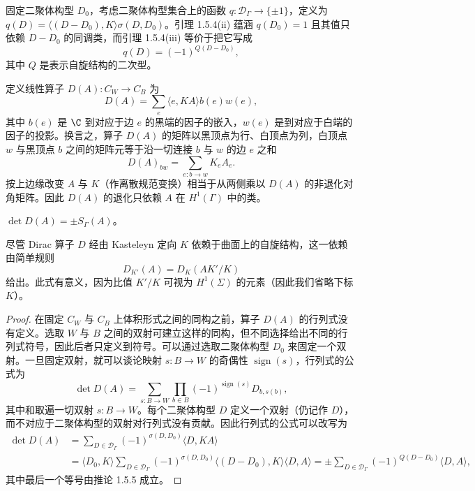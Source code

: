 \begin{corollary}\label{cor:1.5.5}
固定二聚体构型 $D_0$，考虑二聚体构型集合上的函数 $q:\mathcal{D}_\Gamma\to\{\pm1\}$，定义为 $q(D)=\langle(D-D_0),K\rangle\sigma(D,D_0)$。引理 1.5.4(ii) 蕴涵 $q(D_0)=1$ 且其值只依赖 $D-D_0$ 的同调类，而引理 1.5.4(iii) 等价于把它写成
\[
q(D)=(-1)^{Q(D-D_0)},
\]
其中 $Q$ 是表示自旋结构的二次型。
\end{corollary}

定义线性算子 $D(A): C_W\to C_B$ 为
\[
D(A)=\sum_e\langle e,KA\rangle b(e)w(e),
\]
其中 $b(e)$ 是 $\C$ 到对应于边 $e$ 的黑端的因子的嵌入，$w(e)$ 是到对应于白端的因子的投影。换言之，算子 $D(A)$ 的矩阵以黑顶点为行、白顶点为列，白顶点 $w$ 与黑顶点 $b$ 之间的矩阵元等于沿一切连接 $b$ 与 $w$ 的边 $e$ 之和
\[
D(A)_{bw}=\sum_{e:b\to w}K_eA_e.
\]
按上边缘改变 $A$ 与 $K$（作离散规范变换）相当于从两侧乘以 $D(A)$ 的非退化对角矩阵。因此 $D(A)$ 的退化只依赖 $A$ 在 $H^1(\Gamma)$ 中的类。

\begin{lemma}\label{lem:1.5.6}
$\det D(A)=\pm S_\Gamma(A)$。
\end{lemma}

\begin{remark}\label{rem:1.5.7}
尽管 Dirac 算子 $D$ 经由 Kasteleyn 定向 $K$ 依赖于曲面上的自旋结构，这一依赖由简单规则
\[
D_{K'}(A)=D_K(AK'/K)
\]
给出。此式有意义，因为比值 $K'/K$ 可视为 $H^1(\Sigma)$ 的元素（因此我们省略下标 $K$）。
\end{remark}

\begin{proof}
在固定 $C_W$ 与 $C_B$ 上体积形式之间的同构之前，算子 $D(A)$ 的行列式没有定义。选取 $W$ 与 $B$ 之间的双射可建立这样的同构，但不同选择给出不同的行列式符号，因此后者只定义到符号。可以通过选取二聚体构型 $D_0$ 来固定一个双射。一旦固定双射，就可以谈论映射 $s: B\to W$ 的奇偶性 $\operatorname{sign}(s)$，行列式的公式为
\[
\det D(A)=\sum_{s:B\to W}\prod_{b\in B}(-1)^{\operatorname{sign}(s)}D_{b,s(b)},
\]
其中和取遍一切双射 $s: B\to W$。每个二聚体构型 $D$ 定义一个双射（仍记作 $D$），而不对应于二聚体构型的双射对行列式没有贡献。因此行列式的公式可以改写为
\[
\begin{aligned}
\det D(A)&=\sum_{D\in\mathcal{D}_\Gamma}(-1)^{\sigma(D,D_0)}\langle D,KA\rangle\\
&=\langle D_0,K\rangle\sum_{D\in\mathcal{D}_\Gamma}(-1)^{\sigma(D,D_0)}\langle(D-D_0),K\rangle\langle D,A\rangle
=\pm\sum_{D\in\mathcal{D}_\Gamma}(-1)^{Q(D-D_0)}\langle D,A\rangle,
\end{aligned}
\]
其中最后一个等号由推论 1.5.5 成立。
\end{proof}

